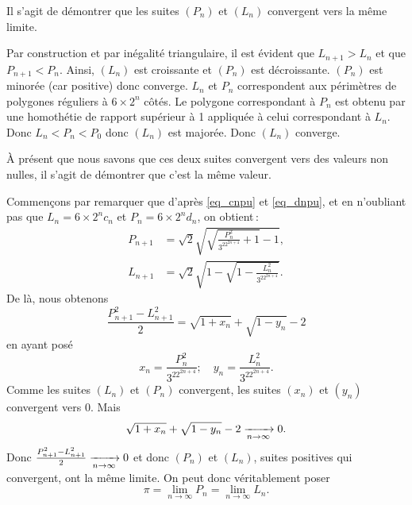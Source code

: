 Il s'agit de démontrer que les suites $(P_n)$ et $(L_n)$ convergent vers la même limite. 


Par construction et par inégalité triangulaire, il est évident que $L_{n+1}>L_n$ et que $P_{n+1}<P_n$. Ainsi, $(L_n)$ est croissante et $(P_n)$ est décroissante. $(P_n)$ est minorée (car positive) donc converge. 
$L_n$ et $P_n$ correspondent aux périmètres de polygones réguliers à $6\times 2^n$ côtés. Le polygone correspondant à $P_n$ est obtenu par une homothétie de rapport supérieur à 1 appliquée à celui correspondant à $L_n$. Donc $L_n<P_n<P_0$ donc $(L_n)$ est majorée. Donc $(L_n)$ converge.

À présent que nous savons que ces deux suites convergent vers des valeurs non nulles, il s'agit de démontrer que c'est la même valeur.

Commençons par remarquer que d'après \eqref{eq_cnpu} et \eqref{eq_dnpu}, et en n'oubliant pas que $L_n=6\times2^n c_n$ et $P_n=6\times 2^n d_n$, on obtient\,:
\begin{align}
	P_{n+1}&=\sqrt{2}\sqrt{\sqrt{\frac{P_n^2}{3^22^{2n+4}}+1}-1},\\
	L_{n+1}&=\sqrt{2}\sqrt{1-\sqrt{1-\frac{L_n^2}{3^22^{2n+4}}}}.
\end{align}
De là, nous obtenons
\begin{equation}
	\frac{P_{n+1}^2-L_{n+1}^2}{2}=\sqrt{1+x_n}+\sqrt{1-y_n}-2
\end{equation}
en ayant posé 
\begin{equation}
	x_n=\frac{P_n^2}{3^22^{2n+4}};\quad y_n=\frac{L_n^2}{3^22^{2n+4}}.
\end{equation}
Comme les suites $(L_n)$ et $(P_n)$ convergent, les suites $(x_n)$ et $(y_n)$ convergent vers 0. Mais
\begin{equation}
	\sqrt{1+x_n}+\sqrt{1-y_n}-2\xrightarrow[n\to\infty]{}{0}.
\end{equation}
Donc $\frac{P_{n+1}^2-L_{n+1}^2}{2}\xrightarrow[n\to\infty]{}{0}$ et donc $(P_n)$ et $(L_n)$, suites positives qui convergent, ont la même limite.
On peut donc véritablement poser
\begin{equation}
	\boxed{\pi=\lim\limits_{n\to\infty}P_n=\lim\limits_{n\to\infty}L_n}.
\end{equation}

